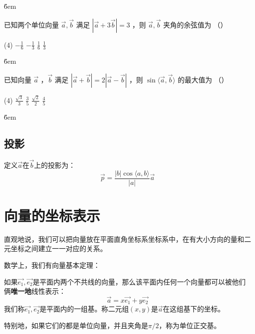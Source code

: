 \v{6em}

\begin{example}
    已知两个单位向量 $\overrightarrow{a}, \overrightarrow{b}$ 满足 $|\overrightarrow{a}+3 \overrightarrow{b}|=3$ ，则 $\overrightarrow{a}, \overrightarrow{b}$ 夹角的余弦值为 （\qquad）
    \begin{tasks}(4)
        \task $-\frac{1}{6}$
        \task $-\frac{1}{3}$
        \task $\frac{1}{6}$
        \task $\frac{1}{3}$
    \end{tasks}
\end{example}

\v{6em}

\begin{example}
    已知向量 $\overrightarrow{a}$ ，$\overrightarrow{b}$ 满足 $|\overrightarrow{a}+\overrightarrow{b}|=2|\overrightarrow{a}-\overrightarrow{b}|$ ，则 $\sin \langle\overrightarrow{a}, \overrightarrow{b}\rangle$ 的最大值为 （\qquad）
    \begin{tasks}(4)
        \task $\frac{\sqrt{3}}{3}$
        \task $\frac{3}{5}$
        \task $\frac{\sqrt{2}}{2}$
        \task $\frac{4}{5}$
    \end{tasks}
\end{example}

\v{6em}

\subsection{投影}

\begin{definition}[投影]
    定义$\overrightarrow{a}$在$\overrightarrow{b}$上的投影为：
    $$
        \overrightarrow{p} = \frac{|b|\cos \langle a,b \rangle}{|a|} \overrightarrow{a}
    $$
\end{definition}

\section{向量的坐标表示}
直观地说，我们可以把向量放在平面直角坐标系坐标系中，在有大小方向的量和二元坐标之间建立一一对应的关系。

数学上，我们有向量基本定理：
\begin{theorem}
    如果$\overrightarrow{e_1}, \overrightarrow{e_2}$是平面内两个不共线的向量，那么该平面内任何一个向量都可以被他们俩\textbf{唯一地}线性表示：
    $$
        \overrightarrow{a} = x\overrightarrow{e_1} + y \overrightarrow{e_2}
    $$
    我们称$\overrightarrow{e_1}, \overrightarrow{e_2}$是平面内的一组基。称二元组$(x,y)$是$\overrightarrow{a}$在这组基下的坐标。

    特别地，如果它们的都是单位向量，并且夹角是$\pi / 2$，称为单位正交基。
\end{theorem}

